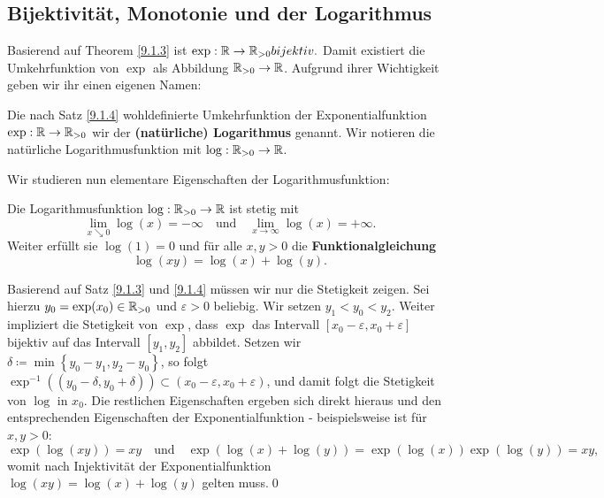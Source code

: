 \subsection{Bijektivität, Monotonie und der Logarithmus}
Basierend auf Theorem \ref{9.1.3} ist $ \exp : \mathbb{R} \to \mathbb{R}_{>0} bijektiv. $ Damit existiert die Umkehrfunktion von $ \exp  $ als Abbildung $ \mathbb{R}_{>0} \to \mathbb{R}  $. Aufgrund ihrer Wichtigkeit geben wir ihr einen eigenen Namen:
\begin{subdefinition}[Logarithmus]
	Die nach Satz \ref{9.1.4} wohldefinierte Umkehrfunktion der Exponentialfunktion $ \exp : \mathbb{R} \to \mathbb{R}_{>0}  $ wir der \textbf{(natürliche) Logarithmus} genannt. Wir notieren die natürliche Logarithmusfunktion mit $ \log : \mathbb{R}_{>0} \to \mathbb{R}  $.
\end{subdefinition}
Wir studieren nun elementare Eigenschaften der Logarithmusfunktion:
\begin{subtheorem}
	Die Logarithmusfunktion $ \log : \mathbb{R}_{>0} \to \mathbb{R}  $ ist stetig mit
	\[
		\lim_{x \searrow 0} \log (x) = -\infty \quad \text{und} \quad \lim_{x \to \infty} \log (x) = +\infty.
	\]
	Weiter erfüllt sie $ \log(1) = 0 $ und für alle $ x, y > 0 $ die \textbf{Funktionalgleichung}
	\[
		\log (xy) = \log (x) + \log (y).
	\]
	
\end{subtheorem}
\begin{subproof*}
	Basierend auf Satz \ref{9.1.3} und \ref{9.1.4} müssen wir nur die Stetigkeit zeigen. Sei hierzu $ y_0 = \exp (x_0) \in \mathbb{R}_{>0}  $ und $ \varepsilon > 0 $ beliebig. Wir setzen $ y_1 < y_0 < y_2 $.
	Weiter impliziert die Stetigkeit von $ \exp  $, dass $ \exp  $ das Intervall $ [x_0 - \varepsilon , x_0 + \varepsilon ] $ bijektiv auf das Intervall $ [y_1, y_2] $ abbildet.
	Setzen wir $ \delta \coloneqq \min \left\{ y_0 - y_1, y_2 - y_0 \right\}  $, so folgt $ \exp^{-1} ((y_0 - \delta, y_0 + \delta)) \subset (x_0 - \varepsilon , x_0 + \varepsilon ) $, und damit folgt die Stetigkeit von $ \log  $ in $ x_0 $. Die restlichen Eigenschaften ergeben sich direkt hieraus und den entsprechenden Eigenschaften der Exponentialfunktion - beispielsweise ist für $ x, y > 0 $:
	\[
		\exp (\log (xy)) = xy \quad \text{und} \quad \exp (\log (x) + \log (y)) = \exp (\log (x)) \exp (\log (y)) = xy,
	\]
	womit nach Injektivität der Exponentialfunktion $ \log (xy) = \log (x) + \log (y) $ gelten muss.\qed
\end{subproof*}

